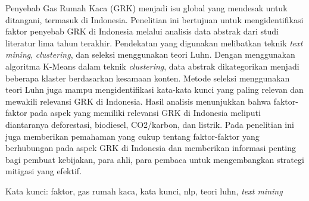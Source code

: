 Penyebab Gas Rumah Kaca (GRK) menjadi isu global yang mendesak untuk ditangani, termasuk di Indonesia. Penelitian ini bertujuan untuk mengidentifikasi faktor penyebab GRK di Indonesia melalui analisis data abstrak dari studi literatur lima tahun terakhir. Pendekatan yang digunakan melibatkan teknik \textit{text mining}, \textit{clustering}, dan seleksi menggunakan teori Luhn. Dengan menggunakan algoritma K-Means dalam teknik \textit{clustering}, data abstrak dikategorikan menjadi beberapa klaster berdasarkan kesamaan konten. Metode seleksi menggunakan teori Luhn juga mampu mengidentifikasi kata-kata kunci yang paling relevan dan mewakili relevansi GRK di Indonesia. Hasil analisis menunjukkan bahwa faktor-faktor pada aspek yang memiliki relevansi GRK di Indonesia meliputi diantaranya deforestasi, biodiesel, CO2/karbon, dan listrik. Pada penelitian ini juga memberikan pemahaman yang cukup tentang faktor-faktor yang berhubungan pada aspek GRK di Indonesia dan memberikan informasi penting bagi pembuat kebijakan, para ahli, para pembaca untuk mengembangkan strategi mitigasi yang efektif.

Kata kunci: faktor, gas rumah kaca, kata kunci, nlp, teori luhn, \textit{text mining}